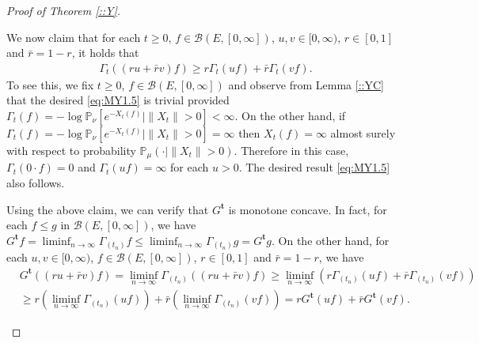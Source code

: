 \documentclass[12pt,a4paper]{amsart}
\numberwithin{equation}{section}
\theoremstyle{plain}
\theoremstyle{definition}
\theoremstyle{remark}
\newenvironment{proof*}[1][\proofname]{
  \renewcommand\qedsymbol{$\blacksquare$}
  \begin{proof}[#1]}{\end{proof}}
\begin{document}
\begin{proof}[Proof of Theorem \ref{::Y}]
\begin{proof*}
We now claim that for each $t\geq 0$, $f\in \mathcal B(E,[0,\infty])$, $u,v \in [0,\infty)$, $r\in [0,1]$ and $\bar r = 1 - r$, it holds that
\begin{align}
  \label{eq:MY1.5}
\Gamma_t((ru+\bar r v)f) 
 \geq r \Gamma_t (uf) + \bar r \Gamma_t (vf).
\end{align}
To see this, we fix $t\geq 0$, $f\in \mathcal B(E,[0,\infty])$ and observe from Lemma \ref{::YC} that the desired \eqref{eq:MY1.5} is trivial provided $\Gamma_t(f) = - \log \mathbb P_\nu[e^{-X_t(f)}|\|X_t\|>0]< \infty$. 
On the other hand, if $\Gamma_t(f) = - \log \mathbb P_\nu[e^{-X_t(f)}|\|X_t\|>0] = \infty$ then $X_t(f) = \infty$ almost surely with respect to probability $\mathbb P_\mu(\cdot | \|X_t\|>0)$. 
Therefore in this case, $\Gamma_t(0\cdot f) = 0$ and $\Gamma_t(uf) = \infty$ for each $u > 0$. 
The desired result \eqref{eq:MY1.5} also follows.

Using the above claim, we can verify that $G^\mathbf t$ is monotone concave.
In fact, for each $f \leq g$ in $\mathcal B(E,[0,\infty])$, we have
\(	
G^{\mathbf t} f = \liminf_{n\to \infty} \Gamma_{(t_n)} f
  \leq \liminf_{n\to \infty} \Gamma_{(t_n)} g
  = G^{\mathbf t} g.
  \)
On the other hand, for each $u,v \in [0,\infty)$, $f\in \mathcal B(E,[0,\infty])$, $r \in [0,1]$ and $\bar r = 1 - r$, we have
\begin{align}
	& G^{\mathbf t}((ru + \bar rv)f)
   = \liminf_{n \to \infty} \Gamma_{(t_n)}((ru + \bar rv)f)
   \geq \liminf_{n\to \infty} (r\Gamma_{(t_n)} (uf) + \bar r\Gamma_{(t_n)}(vf)) \\
  & \geq r (\liminf_{n\to \infty} \Gamma_{(t_n)} (uf)) + \bar r (\liminf_{n\to \infty} \Gamma_{(t_n)}(vf) ) 
    = r G^{\mathbf t} (uf) + \bar r G^{\mathbf t}(vf).
\end{align}


\end{proof*}
\end{proof}
\end{document}
